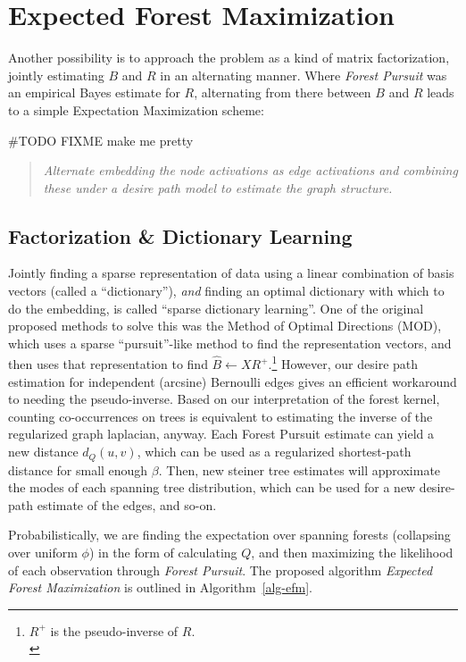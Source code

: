 \documentclass[%
	12pt,
		oneside,
		letterpaper
]{book}
\begin{document}
\section{Expected Forest
Maximization}\label{expected-forest-maximization}

Another possibility is to approach the problem as a kind of matrix
factorization, jointly estimating \(B\) and \(R\) in an alternating
manner. Where \emph{Forest Pursuit} was an empirical Bayes estimate for
\(R\), alternating from there between \(B\) and \(R\) leads to a simple
Expectation Maximization scheme:

\#TODO FIXME make me pretty

\begin{quote}
\emph{Alternate embedding the node activations as edge activations and
combining these under a desire path model to estimate the graph
structure.}
\end{quote}

\subsection{Factorization \& Dictionary
Learning}\label{factorization-dictionary-learning}

Jointly finding a sparse representation of data using a linear
combination of basis vectors (called a ``dictionary''), \emph{and}
finding an optimal dictionary with which to do the embedding, is called
``sparse dictionary learning''. One of the original proposed methods to
solve this was the Method of Optimal Directions
(MOD)\autocite{Methodoptimaldirections_Engan1999}, which uses a sparse
``pursuit''-like method to find the representation vectors, and then
uses that representation to find \(\hat{B}\gets XR^+\).\footnote{
  \(R^+\) is the pseudo-inverse of \(R\).\\
} However, our desire path estimation for independent (arcsine)
Bernoulli edges gives an efficient workaround to needing the
pseudo-inverse. Based on our interpretation of the forest kernel,
counting co-occurrences on trees is equivalent to estimating the inverse
of the regularized graph laplacian, anyway. Each Forest Pursuit estimate
can yield a new distance \(d_Q(u,v)\), which can be used as a
regularized shortest-path distance for small enough \(\beta\). Then, new
steiner tree estimates will approximate the modes of each spanning tree
distribution, which can be used for a new desire-path estimate of the
edges, and so-on.

Probabilistically, we are finding the expectation over spanning forests
(collapsing over uniform \(\phi\)) in the form of calculating \(Q\), and
then maximizing the likelihood of each observation through \emph{Forest
Pursuit}. The proposed algorithm \emph{Expected Forest Maximization} is
outlined in Algorithm~\ref{alg-efm}.
\end{document}
